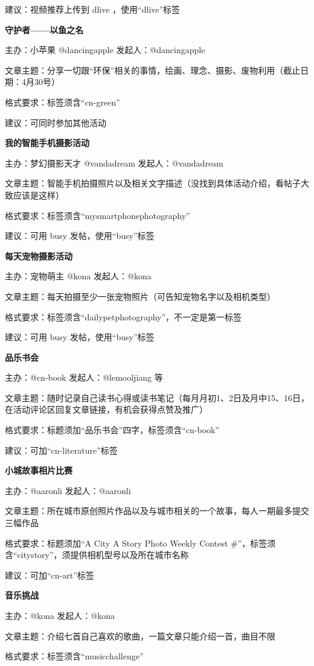\documentclass[]{ctexbook}
\begin{document}
建议：视频推荐上传到 dlive ，使用``dlive''标签

\textbf{守护者------以鱼之名}

主办：小苹果 @dancingapple 发起人：@dancingapple

文章主题：分享一切跟``环保''相关的事情，绘画、理念、摄影、废物利用（截止日期：4月30号）

格式要求：标签须含``cn-green''

建议：可同时参加其他活动

\textbf{我的智能手机摄影活动}

主办：梦幻摄影天才 @vandadream 发起人：@vandadream

文章主题：智能手机拍摄照片以及相关文字描述（没找到具体活动介绍，看帖子大致应该是这样）

格式要求：标签须含``mysmartphonephotography''

建议：可用 busy 发帖，使用``busy''标签

\textbf{每天宠物摄影活动}

主办：宠物萌主 @kona 发起人：@kona

文章主题：每天拍摄至少一张宠物照片（可告知宠物名字以及相机类型）

格式要求：标签须含``dailypetphotography''，不一定是第一标签

建议：可用 busy 发帖，使用``busy''标签

\textbf{品乐书会}

主办：@cn-book 发起人：@lemooljiang 等

文章主题：随时记录自己读书心得或读书笔记（每月月初1、2日及月中15、16日，在活动评论区回复文章链接，有机会获得点赞及推广）

格式要求：标题须加``品乐书会''四字，标签须含``cn-book''

建议：可加``cn-literature''标签

\textbf{小城故事相片比赛}

主办：@aaronli 发起人：@aaronli

文章主题：所在城市原创照片作品以及与城市相关的一个故事，每人一期最多提交三幅作品

格式要求：标题须加``A City A Story Photo Weekly Contest \#''，标签须含``citystory''，须提供相机型号以及所在城市名称

建议：可加``cn-art''标签

\textbf{音乐挑战}

主办：@kona 发起人：@kona

文章主题：介绍七首自己喜欢的歌曲，一篇文章只能介绍一首，曲目不限

格式要求：标签须含``musicchallenge''
\end{document}
